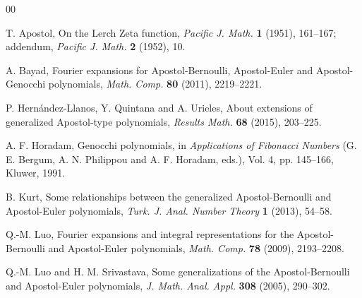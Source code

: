 \documentclass[11pt,a4paper]{amsart}
\theoremstyle{plain}
\theoremstyle{plain}
\theoremstyle{plain}
\begin{document}
\begin{thebibliography}{00}

T. Apostol, 
{On the Lerch Zeta function},
\textit{Pacific J. Math.} \textbf{1} (1951), 161--167;
addendum, \textit{Pacific J. Math.} \textbf{2} (1952), 10.

A. Bayad, 
Fourier expansions for Apostol-Bernoulli, Apostol-Euler and Apostol-Genocchi polynomials,
\textit{Math. Comp.}
\textbf{80} (2011), 2219--2221. 

P. Hern\'andez-Llanos, Y. Quintana and A. Urieles,
About extensions of generalized Apostol-type polynomials,
\textit{Results Math.} %
\textbf{68} (2015), 203--225. 

A. F. Horadam, 
Genocchi polynomials, 
in
\textit{Applications of Fibonacci Numbers}
(G. E. Bergum, A. N. Philippou and A. F. Horadam, eds.),
Vol. 4, pp. 145--166, Kluwer, 1991.

B. Kurt,
Some relationships between the generalized Apostol-Bernoulli and Apostol-Euler polynomials,
\textit{Turk. J. Anal. Number Theory}
\textbf{1} (2013), 54--58.


Q.-M. Luo, %
Fourier expansions and integral representations for the Apostol-Bernoulli and Apostol-Euler polynomials,
\textit{Math. Comp.} 
\textbf{78} (2009), 2193--2208. 

Q.-M. Luo and H. M. Srivastava,
{Some generalizations of the Apostol-Bernoulli and Apostol-Euler polynomials},
\textit{J. Math. Anal. Appl.} 
\textbf{308} (2005), 290--302.


\end{thebibliography}
\end{document}
